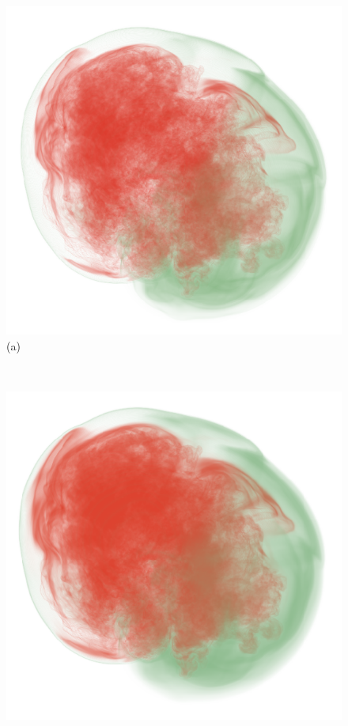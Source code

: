 \documentclass[twoside,twocolumn,10pt]{article}
\begin{document}
\begin{figure}
	\centering
	\begin{minipage}{.36\textwidth}
		\centering
		\includegraphics[width=1\linewidth]{crop/supernova_merged_red_green_crop}
		(a)
	\end{minipage}~
	\begin{minipage}{.36\textwidth}
		\centering
		\includegraphics[width=1\linewidth]{crop/supernova_merged_segment_red_green_crop}

\end{minipage}
\end{figure}
\end{document}
